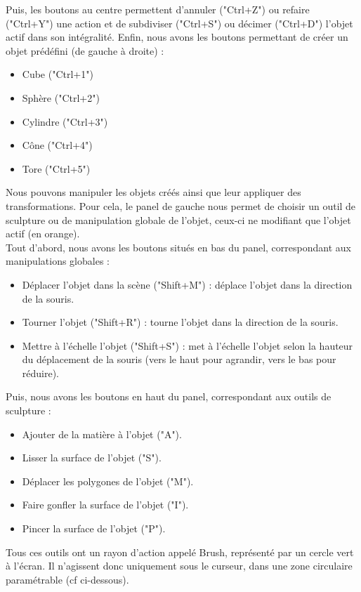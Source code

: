 \documentclass[a4paper]{memoir}
\begin{document}
			Puis, les boutons au centre permettent d'annuler ("Ctrl+Z") ou refaire ("Ctrl+Y") une action et de subdiviser ("Ctrl+S") ou décimer ("Ctrl+D") 
			l'objet actif dans son intégralité.
			Enfin, nous avons les boutons permettant de créer un objet prédéfini (de gauche à droite) :
			\begin{itemize}
				\item Cube ("Ctrl+1")
				\item Sphère ("Ctrl+2")
				\item Cylindre ("Ctrl+3")
				\item Cône ("Ctrl+4")
				\item Tore ("Ctrl+5")
			\end{itemize}
			Nous pouvons manipuler les objets créés ainsi que leur appliquer des transformations. Pour cela, le panel de gauche nous permet de choisir un 
			outil de sculpture ou de manipulation globale de l'objet, ceux-ci ne modifiant que l'objet actif (en orange).\\
			Tout d'abord, nous avons les boutons situés en bas du panel, correspondant aux manipulations globales :
			\begin{itemize}
				\item Déplacer l'objet dans la scène ("Shift+M") : déplace l'objet dans la direction de la souris.
				\item Tourner l'objet ("Shift+R") : tourne l'objet dans la direction de la souris.
				\item Mettre à l'échelle l'objet ("Shift+S") : met à l'échelle l'objet selon la hauteur du déplacement de la souris (vers le haut pour 
				agrandir, vers le bas pour réduire).
			\end{itemize}
			Puis, nous avons les boutons en haut du panel, correspondant aux outils de sculpture :
			\begin{itemize}
				\item  Ajouter de la matière à l'objet ("A").
				\item  Lisser la surface de l'objet ("S"). 
				\item  Déplacer les polygones de l'objet ("M"). 
				\item  Faire gonfler la surface de l'objet ("I"). 
				\item  Pincer la surface de l'objet ("P").
			\end{itemize}
			Tous ces outils ont un rayon d'action appelé Brush, représenté par un cercle vert à l'écran. Il n'agissent donc uniquement sous le curseur, dans 
			une zone circulaire paramétrable (cf ci-dessous).\\
\end{document}
